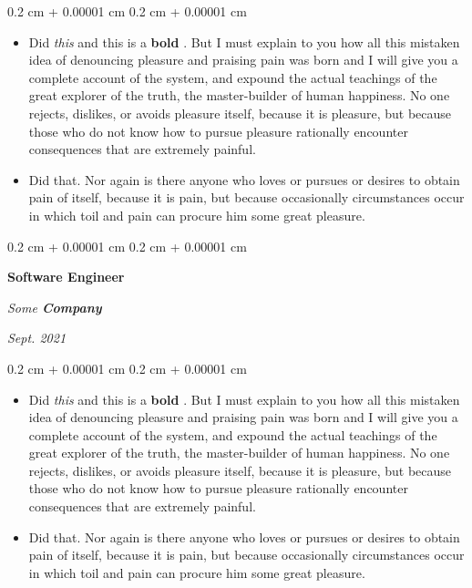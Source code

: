 \documentclass[10pt, letterpaper]{article}
\newenvironment{highlights}{
    \begin{itemize}[
        topsep=0.10 cm,
        parsep=0.10 cm,
        partopsep=0pt,
        itemsep=0pt,
        leftmargin=0.4 cm + 10pt + 0.6 cm
    ]
}{
    \end{itemize}
} %
\newenvironment{onecolentry}{
    \begin{adjustwidth}{
        0.2 cm + 0.00001 cm
    }{
        0.2 cm + 0.00001 cm
    }
}{
    \end{adjustwidth}
} %
\newenvironment{threecolentry}[3][]{
    \onecolentry
    \def\thirdColumn{#3}
    \setcolumnwidth{0.6 cm, \fill, 4.5 cm}
    \begin{paracol}{3}
    #2 \switchcolumn
}{
    \switchcolumn \raggedleft \thirdColumn
    \end{paracol}
    \endonecolentry
} %
\let\hrefWithoutArrow\href
\renewcommand{\href}[2]{\hrefWithoutArrow{#1}{\mbox{\ifthenelse{\equal{#2}{}}{ }{#2 }\raisebox{.15ex}{\footnotesize \faExternalLink*}}}}
\begin{document}
        \vspace{0.10 cm-3px}
        \begin{onecolentry}
            \begin{highlights}
                \item Did \textit{this} and this is a \textbf{bold} \href{https://example.com}{link}. But I must explain to you how all this mistaken idea of denouncing pleasure and praising pain was born and I will give you a complete account of the system, and expound the actual teachings of the great explorer of the truth, the master-builder of human happiness. No one rejects, dislikes, or avoids pleasure itself, because it is pleasure, but because those who do not know how to pursue pleasure rationally encounter consequences that are extremely painful.
                \item Did that. Nor again is there anyone who loves or pursues or desires to obtain pain of itself, because it is pain, but because occasionally circumstances occur in which toil and pain can procure him some great pleasure.
            \end{highlights}
        \end{onecolentry}


        \vspace{0.2 cm-3px}

        \begin{threecolentry}{
            \vspace*{\fill}
            \textbullet
            \vspace*{3px}
            \vspace*{\fill}
        }{
            
            
        \textit{Sept. 2021}}
            \textbf{Software Engineer}
            
            \textit{Some \textbf{Company}}
        \end{threecolentry}

        \vspace{0.10 cm-3px}
        \begin{onecolentry}
            \begin{highlights}
                \item Did \textit{this} and this is a \textbf{bold} \href{https://example.com}{link}. But I must explain to you how all this mistaken idea of denouncing pleasure and praising pain was born and I will give you a complete account of the system, and expound the actual teachings of the great explorer of the truth, the master-builder of human happiness. No one rejects, dislikes, or avoids pleasure itself, because it is pleasure, but because those who do not know how to pursue pleasure rationally encounter consequences that are extremely painful.
                \item Did that. Nor again is there anyone who loves or pursues or desires to obtain pain of itself, because it is pain, but because occasionally circumstances occur in which toil and pain can procure him some great pleasure.
            \end{highlights}
        \end{onecolentry}
\end{document}
